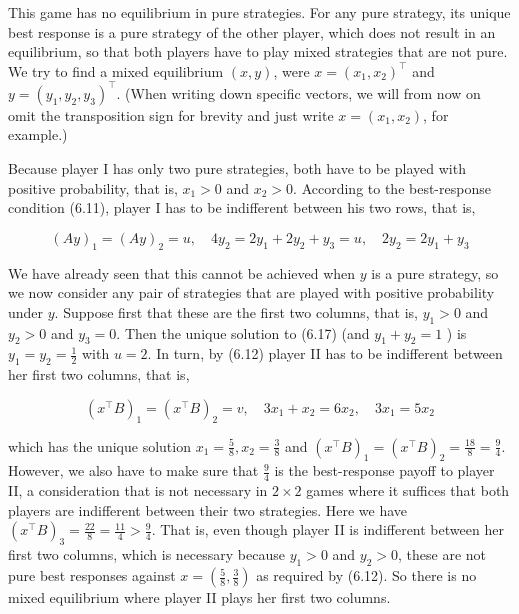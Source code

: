 \documentclass[12pt]{article}
\begin{document}
This game has no equilibrium in pure strategies. For any pure strategy, its unique best response is a pure strategy of the other player, which does not result in an\\
equilibrium, so that both players have to play mixed strategies that are not pure. We try to find a mixed equilibrium $(x, y)$, were $x=\left(x_{1}, x_{2}\right)^{\top}$ and $y=\left(y_{1}, y_{2}, y_{3}\right)^{\top}$. (When writing down specific vectors, we will from now on omit the transposition sign for brevity and just write $x=\left(x_{1}, x_{2}\right)$, for example.)

Because player I has only two pure strategies, both have to be played with positive probability, that is, $x_{1}>0$ and $x_{2}>0$. According to the best-response condition (6.11), player I has to be indifferent between his two rows, that is,


\begin{equation*}
(A y)_{1}=(A y)_{2}=u, \quad 4 y_{2}=2 y_{1}+2 y_{2}+y_{3}=u, \quad 2 y_{2}=2 y_{1}+y_{3} \tag{6.17}
\end{equation*}


We have already seen that this cannot be achieved when $y$ is a pure strategy, so we now consider any pair of strategies that are played with positive probability under $y$. Suppose first that these are the first two columns, that is, $y_{1}>0$ and $y_{2}>0$ and $y_{3}=0$. Then the unique solution to (6.17) (and $y_{1}+y_{2}=1$ ) is $y_{1}=y_{2}=\frac{1}{2}$ with $u=2$. In turn, by (6.12) player II has to be indifferent between her first two columns, that is,


\begin{equation*}
\left(x^{\top} B\right)_{1}=\left(x^{\top} B\right)_{2}=v, \quad 3 x_{1}+x_{2}=6 x_{2}, \quad 3 x_{1}=5 x_{2} \tag{6.18}
\end{equation*}


which has the unique solution $x_{1}=\frac{5}{8}, x_{2}=\frac{3}{8}$ and $\left(x^{\top} B\right)_{1}=\left(x^{\top} B\right)_{2}=\frac{18}{8}=\frac{9}{4}$. However, we also have to make sure that $\frac{9}{4}$ is the best-response payoff to player II, a consideration that is not necessary in $2 \times 2$ games where it suffices that both players are indifferent between their two strategies. Here we have $\left(x^{\top} B\right)_{3}=\frac{22}{8}=\frac{11}{4}>\frac{9}{4}$. That is, even though player II is indifferent between her first two columns, which is necessary because $y_{1}>0$ and $y_{2}>0$, these are not pure best responses against $x=\left(\frac{5}{8}, \frac{3}{8}\right)$ as required by (6.12). So there is no mixed equilibrium where player II plays her first two columns.
\end{document}
